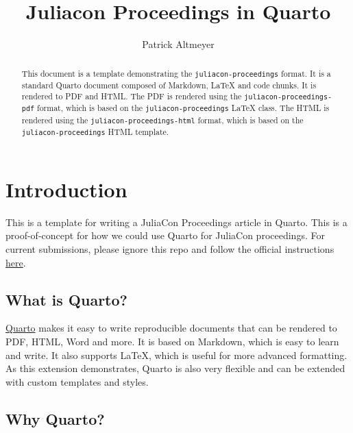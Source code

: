 \documentclass{juliacon}
\title{Juliacon Proceedings in Quarto}
\author[1]{Patrick Altmeyer}
\affil[1]{Delft University of Technology}
\date{}
\begin{document}
\maketitle

\begin{abstract}

This document is a template demonstrating the
\texttt{juliacon-proceedings} format. It is a standard Quarto document
composed of Markdown, LaTeX and code chunks. It is rendered to PDF and
HTML. The PDF is rendered using the \texttt{juliacon-proceedings-pdf}
format, which is based on the \texttt{juliacon-proceedings} LaTeX class.
The HTML is rendered using the \texttt{juliacon-proceedings-html}
format, which is based on the \texttt{juliacon-proceedings} HTML
template.
\end{abstract}



\setcounter{page}{1}

\section{Introduction}\label{sec-intro}

This is a template for writing a JuliaCon Proceedings article in Quarto.
This is a proof-of-concept for how we could use Quarto for JuliaCon
proceedings. For current submissions, please ignore this repo and follow
the official instructions
\href{https://github.com/JuliaCon/JuliaConSubmission.jl}{here}.

\subsection{What is Quarto?}\label{what-is-quarto}

\href{https://quarto.org/}{Quarto} makes it easy to write reproducible
documents that can be rendered to PDF, HTML, Word and more. It is based
on Markdown, which is easy to learn and write. It also supports LaTeX,
which is useful for more advanced formatting. As this extension
demonstrates, Quarto is also very flexible and can be extended with
custom templates and styles.

\subsection{Why Quarto?}\label{why-quarto}
\end{document}
